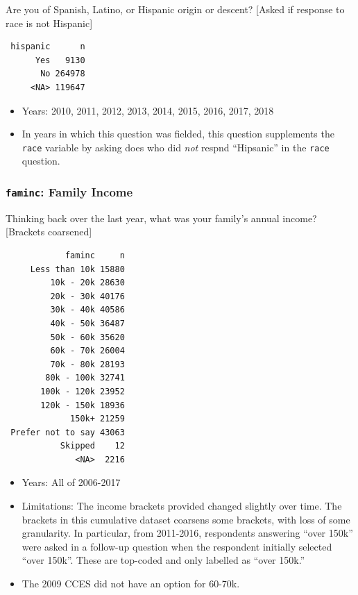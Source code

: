 \documentclass[10pt,article,oneside]{memoir}
\theoremstyle{definition}
\begin{document}
Are you of Spanish, Latino, or Hispanic origin or descent? {[}Asked if
response to race is not Hispanic{]}

\begin{verbatim}
 hispanic      n
      Yes   9130
       No 264978
     <NA> 119647
\end{verbatim}

\begin{itemize}
\tightlist
\item
  Years: 2010, 2011, 2012, 2013, 2014, 2015, 2016, 2017, 2018
\item
  In years in which this question was fielded, this question supplements
  the \texttt{race} variable by asking does who did \emph{not} respnd
  ``Hipsanic'' in the \texttt{race} question.
\end{itemize}

\hypertarget{faminc-family-income}{%
\subsubsection{\texorpdfstring{\texttt{faminc}: Family
Income}{faminc: Family Income}}\label{faminc-family-income}}

Thinking back over the last year, what was your family's annual income?
{[}Brackets coarsened{]}

\begin{verbatim}
            faminc     n
     Less than 10k 15880
         10k - 20k 28630
         20k - 30k 40176
         30k - 40k 40586
         40k - 50k 36487
         50k - 60k 35620
         60k - 70k 26004
         70k - 80k 28193
        80k - 100k 32741
       100k - 120k 23952
       120k - 150k 18936
             150k+ 21259
 Prefer not to say 43063
           Skipped    12
              <NA>  2216
\end{verbatim}

\begin{itemize}
\tightlist
\item
  Years: All of 2006-2017
\item
  Limitations: The income brackets provided changed slightly over time.
  The brackets in this cumulative dataset coarsens some brackets, with
  loss of some granularity. In particular, from 2011-2016, respondents
  answering ``over 150k'' were asked in a follow-up question when the
  respondent initially selected ``over 150k''. These are top-coded and
  only labelled as ``over 150k.''
\item
  The 2009 CCES did not have an option for 60-70k.
\end{itemize}
\end{document}
